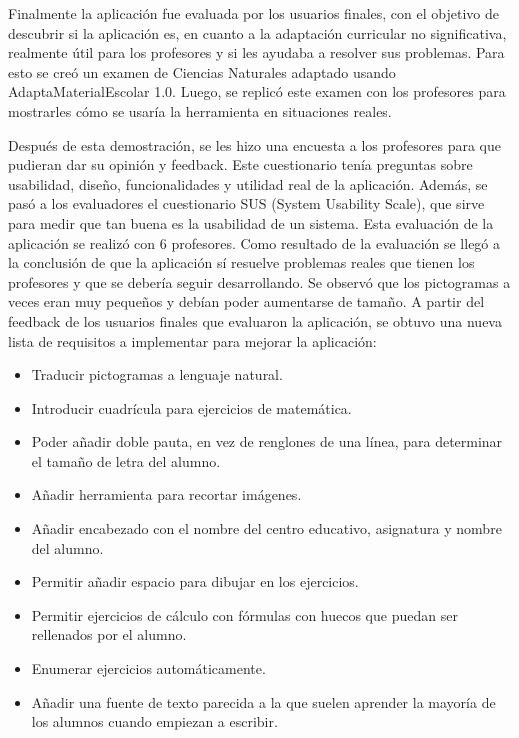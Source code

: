 Finalmente la aplicación fue evaluada por los usuarios finales, con el objetivo de descubrir si la aplicación es, en cuanto a la adaptación curricular no significativa, realmente útil para los profesores y si les ayudaba a resolver sus problemas. Para esto se creó un examen de Ciencias Naturales adaptado usando AdaptaMaterialEscolar 1.0. Luego, se replicó este examen con los profesores para mostrarles cómo se usaría la herramienta en situaciones reales.

Después de esta demostración, se les hizo una encuesta a los profesores para que pudieran dar su opinión y feedback. Este cuestionario tenía preguntas sobre usabilidad, diseño, funcionalidades y utilidad real de la aplicación. Además, se pasó a los evaluadores el cuestionario SUS (System Usability Scale), que sirve para medir que tan buena es la usabilidad de un sistema. Esta evaluación de la aplicación se realizó con 6 profesores. Como resultado de la evaluación se llegó a la conclusión de que la aplicación sí resuelve problemas reales que tienen los profesores y que se debería seguir desarrollando. Se observó que los pictogramas a veces eran muy pequeños y debían poder aumentarse de tamaño.
A partir del feedback de los usuarios finales que evaluaron la aplicación, se obtuvo una nueva lista de requisitos a implementar para mejorar la aplicación:

\begin{itemize}
    \item Traducir pictogramas a lenguaje natural.
    \item Introducir cuadrícula para ejercicios de matemática.
    \item Poder añadir doble pauta, en vez de renglones de una línea, para determinar el tamaño de letra del alumno.
    \item Añadir herramienta para recortar imágenes.
    \item Añadir encabezado con el nombre del centro educativo, asignatura y nombre del alumno.
    \item Permitir añadir espacio para dibujar en los ejercicios.
    \item Permitir ejercicios de cálculo con fórmulas con huecos que puedan ser rellenados por el alumno.
    \item Enumerar ejercicios automáticamente.
    \item Añadir una fuente de texto parecida a la que suelen aprender la mayoría de los alumnos cuando empiezan a escribir.
\end{itemize}